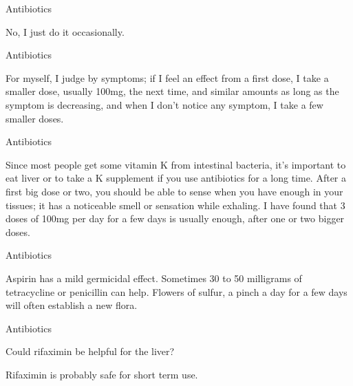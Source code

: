 \documentclass[11pt,oneside,openany,extrafontsizes]{memoir}
\begin{document}
\begin{standalonequote}{Antibiotics}

    \begin{answer}
        No, I just do it occasionally.
    \end{answer}
\end{standalonequote}

\begin{standalonequote}{Antibiotics}

    \begin{answer}
        For myself, I judge by symptoms; if I feel an effect from a first dose, I take a smaller dose, usually 100mg, the next time, and similar amounts as long as the symptom is decreasing, and when I don't notice any symptom, I take a few smaller doses.
    \end{answer}
\end{standalonequote}

\begin{standalonequote}{Antibiotics}

    \begin{answer}
        Since most people get some vitamin K from intestinal bacteria, it's important to eat liver or to take a K supplement if you use antibiotics for a long time. After a first big dose or two, you should be able to sense when you have enough in your tissues; it has a noticeable smell or sensation while exhaling. I have found that 3 doses of 100mg per day for a few days is usually enough, after one or two bigger doses.
    \end{answer}
\end{standalonequote}

\begin{standalonequote}{Antibiotics}

    \begin{answer}
        Aspirin has a mild germicidal effect. Sometimes 30 to 50 milligrams of tetracycline or penicillin can help. Flowers of sulfur, a pinch a day for a few days will often establish a new flora.
    \end{answer}
\end{standalonequote}

\begin{qaexchange}{Antibiotics}

    \begin{question}
        Could rifaximin be helpful for the liver?
    \end{question}

    \begin{answer}
      Rifaximin is probably safe for short term use.
    \end{answer}
\end{qaexchange}
\end{document}
